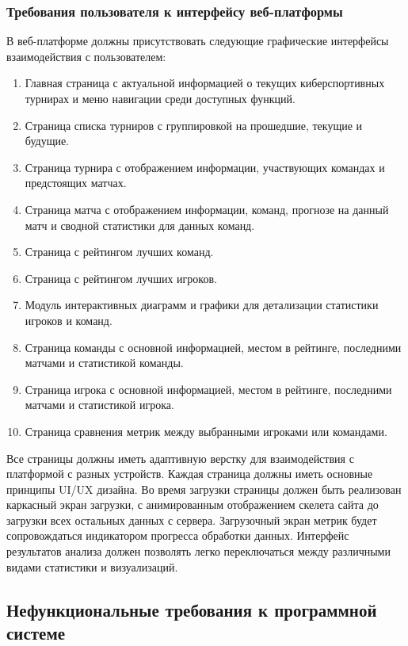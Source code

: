 \subsubsection{Требования пользователя к интерфейсу веб-платформы}

В веб-платформе должны присутствовать следующие графические интерфейсы взаимодействия с пользователем:

\begin{enumerate}
	\item Главная страница с актуальной информацией о текущих киберспортивных турнирах и меню навигации среди доступных функций.
	\item Страница списка турниров с группировкой на прошедшие, текущие и будущие.
	\item Страница турнира с отображением информации, участвующих командах и предстоящих матчах.
	\item Страница матча с отображением информации, команд, прогнозе на данный матч и сводной статистики для данных команд.
	\item Страница с рейтингом лучших команд.
	\item Страница с рейтингом лучших игроков.
	\item Модуль интерактивных диаграмм и графики для детализации статистики игроков и команд.
	\item Страница команды с основной информацией, местом в рейтинге, последними матчами и статистикой команды.
	\item Страница игрока с основной информацией, местом в рейтинге, последними матчами и статистикой игрока.
	\item Страница сравнения метрик между выбранными игроками или командами.
\end{enumerate}

Все страницы должны иметь адаптивную верстку для взаимодействия с платформой с разных устройств. Каждая страница должны иметь основные принципы UI/UX дизайна.
Во время загрузки страницы должен быть реализован каркасный экран загрузки, с анимированным отображением скелета сайта до загрузки всех остальных данных с сервера. Загрузочный экран метрик будет сопровождаться индикатором прогресса обработки данных. Интерфейс результатов анализа должен позволять легко переключаться между различными видами статистики и визуализаций.

\subsection{Нефункциональные требования к программной системе}
